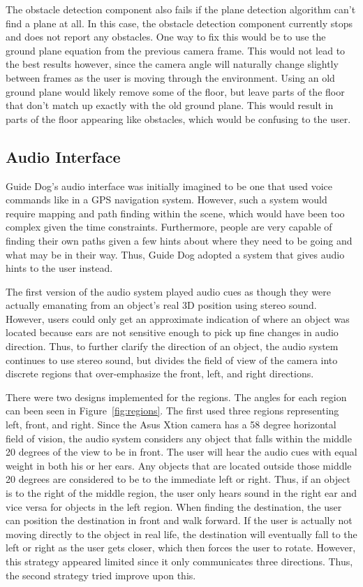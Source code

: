 The obstacle detection component also fails if the plane detection algorithm
can't find a plane at all. In this case, the obstacle detection component
currently stops and does not report any obstacles. One way to fix this would be
to use the ground plane equation from the previous camera frame. This would not
lead to the best results however, since the camera angle will naturally change
slightly between frames as the user is moving through the environment. Using an
old ground plane would likely remove some of the floor, but leave parts of the
floor that don't match up exactly with the old ground plane. This would result
in parts of the floor appearing like obstacles, which would be confusing to the
user.


\subsection{Audio Interface}
\label{sec:eval-audio}

Guide Dog's audio interface was initially imagined to be one that used voice
commands like in a GPS navigation system. However, such a system would require
mapping and path finding within the scene, which would have been too complex
given the time constraints. Furthermore, people are very capable of finding
their own paths given a few hints about where they need to be going and what
may be in their way. Thus, Guide Dog adopted a system that gives audio hints to
the user instead.

The first version of the audio system played audio cues as though they were
actually emanating from an object's real 3D position using stereo sound. However,
users could only get an approximate indication of where an object was located
because ears are not sensitive enough to pick up fine changes in audio direction. Thus, to further clarify
the direction of an object, the audio system continues to use stereo sound, but
divides the field of view of the camera into discrete regions that over-emphasize
the front, left, and right directions.

There were two designs implemented for the regions. The angles for each region
can been seen in Figure~\ref{fig:regions}. The first used three regions
representing left, front, and right. Since the Asus Xtion camera has a 58 degree
horizontal field of vision, the audio system considers any object that
falls within the middle 20 degrees of the view to be in front. The
user will hear the audio cues with equal weight in both his or her ears. Any
objects that are located outside those middle 20 degrees are considered to be to the
immediate left or right. Thus, if an object is to the right of the middle region,
the user only hears sound in the right ear and vice versa for objects in the
left region. When finding the destination, the user can position the destination
in front and walk forward. If the user is actually not moving directly to the
object in real life, the destination will eventually fall to the left or right
as the user gets closer, which then forces the user to rotate. However, this
strategy appeared limited since it only communicates three directions. Thus, the
second strategy tried improve upon this.

